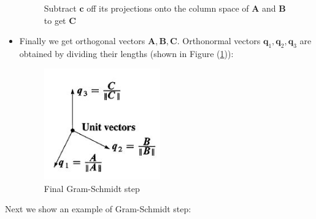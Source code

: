\begin{itemize}
\begin{figure}[H]
\caption{Subtract $\bm c$ off its projections onto the column space of $\bm A$ and $\bm B$ to get $\bm C$}
\end{figure}
\item
Finally we get orthogonal vectors $\bm A,\bm B,\bm C$. Orthonormal vectors $\bm q_1,\bm q_2,\bm q_3$ are obtained by dividing their lengths (shown in Figure (\ref{Final_gram})):
\begin{figure}[H]\centering
\includegraphics[width=5cm]{week5/finalgram}
\caption{Final Gram-Schmidt step}
\label{Final_gram}
\end{figure}
\end{itemize}
Next we show an example of Gram-Schmidt step:
